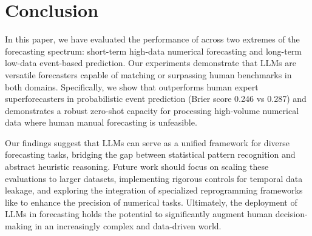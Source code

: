 \section{Conclusion}

In this paper, we have evaluated the performance of \methodname across two extremes of the forecasting spectrum: short-term high-data numerical forecasting and long-term low-data event-based prediction. Our experiments demonstrate that LLMs are versatile forecasters capable of matching or surpassing human benchmarks in both domains. Specifically, we show that \methodname outperforms human expert superforecasters in probabilistic event prediction (Brier score 0.246 vs 0.287) and demonstrates a robust zero-shot capacity for processing high-volume numerical data where human manual forecasting is unfeasible.

Our findings suggest that LLMs can serve as a unified framework for diverse forecasting tasks, bridging the gap between statistical pattern recognition and abstract heuristic reasoning. Future work should focus on scaling these evaluations to larger datasets, implementing rigorous controls for temporal data leakage, and exploring the integration of specialized reprogramming frameworks like \timellm to enhance the precision of numerical tasks. Ultimately, the deployment of LLMs in forecasting holds the potential to significantly augment human decision-making in an increasingly complex and data-driven world.
